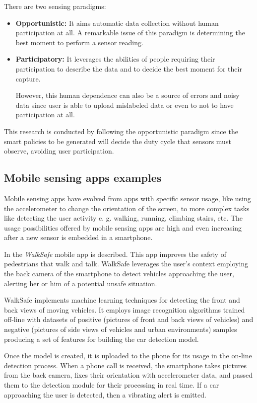 There are two sensing paradigms:
\begin{itemize}
  \item \textbf{Opportunistic:} It aims automatic data collection without human participation at all. A remarkable issue of this paradigm is determining the best moment to perform a sensor reading.

  \item \textbf{Participatory:} It leverages the abilities of people requiring their participation to describe the data and to decide the best moment for their capture.

  However, this human dependence can also be a source of errors and noisy data since user is able to upload mislabeled data or even to not to have participation at all.
\end{itemize}


This research is conducted by following the opportunistic paradigm since the smart policies to be generated will decide the duty cycle that sensors must observe, avoiding user participation.


\subsection{Mobile sensing apps examples}
\label{sub:mobile_sensing_apps_examples}

Mobile sensing apps have evolved from apps with specific sensor usage, like using the accelerometer to change the orientation of the screen, to more complex tasks like detecting the user activity e. g. walking, running, climbing stairs, etc.
The usage possibilities offered by mobile sensing apps are high and even increasing after a new sensor is embedded in a smartphone.

In \cite{Wang2012} the \emph{WalkSafe} mobile app is described.
This app improves the safety of pedestrians that walk and talk. WalkSafe leverages the user's context employing the back camera of the smartphone to detect vehicles approaching the user, alerting her or him of a potential unsafe situation.

WalkSafe implements machine learning techniques for detecting the front and back views of moving vehicles.
It employs image recognition algorithms trained off-line with datasets of positive (pictures of front and back views of vehicles) and negative (pictures of side views of vehicles and urban environments) samples producing a set of features for building the car detection model.

Once the model is created, it is uploaded to the phone for its usage in the on-line detection process.
When a phone call is received, the smartphone takes pictures from the back camera, fixes their orientation with accelerometer data, and passed them to the detection module for their processing in real time.
If a car approaching the user is detected, then a vibrating alert is emitted.


